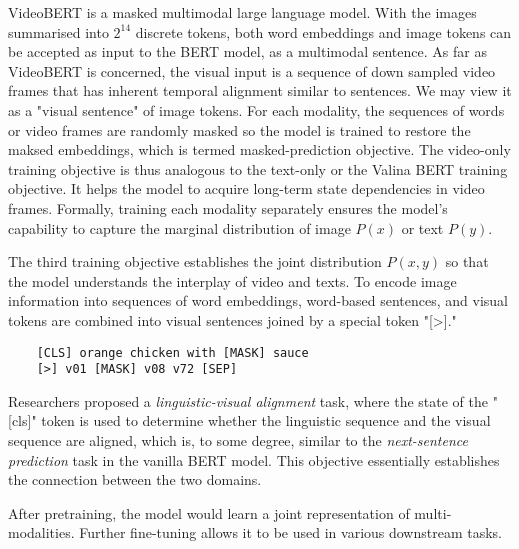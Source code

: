 \documentclass[11pt]{article}
\begin{document}
VideoBERT is a masked multimodal large language model. With the images summarised into $2^{14}$ discrete tokens, both word embeddings and image tokens can be accepted as input to the BERT model, as a multimodal sentence. As far as VideoBERT is concerned, the visual input is a sequence of down sampled video frames that has inherent temporal alignment similar to sentences. We may view it as a "visual sentence" of image tokens. For each modality, the sequences of words or video frames are randomly masked so the model is trained to restore the maksed embeddings, which is termed masked-prediction objective. The video-only training objective is thus analogous to the text-only or the Valina BERT training objective. It helps the model to acquire long-term state dependencies in video frames. Formally, training each modality separately ensures the model's capability to capture the marginal distribution of image $P(x)$ or text $P(y)$.

The third training objective establishes the joint distribution $P(x,y)$ so that the model understands the interplay of video and texts. To encode image information into sequences of word embeddings, word-based sentences, and visual tokens are combined into visual sentences joined by a special token "[>]."
\begin{verbatim}
    [CLS] orange chicken with [MASK] sauce 
    [>] v01 [MASK] v08 v72 [SEP]
\end{verbatim}
Researchers proposed a \textit{linguistic-visual alignment} task, where the state of the "[cls]" token is used to determine whether the linguistic sequence and the visual sequence are aligned, which is, to some degree, similar to the \textit{next-sentence prediction} task in the vanilla BERT model. This objective essentially establishes the connection between the two domains. 

After pretraining, the model would learn a joint representation of multi-modalities. Further fine-tuning allows it to be used in various downstream tasks.
\end{document}
